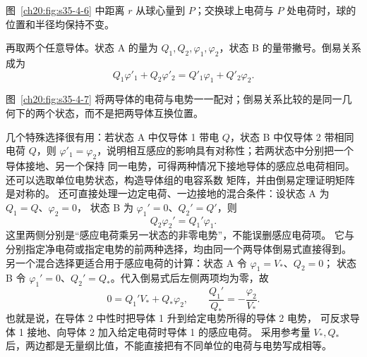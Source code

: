 {图~\ref{ch20:fig:s35-4-6} 中距离 $r$ 从球心量到 $P$；交换球上电荷与 $P$ 处电荷时，球的位置和半径均保持不变。

\par\noindent\begin{minipage}{\linewidth}
\greenSphereFigure
{}\label{ch20:fig:s35-4-6}
\end{minipage}\par\medskip

再取两个任意导体。状态 A 的量为 $Q_1,Q_2,\varphi_1,\varphi_2$，状态 B 的量带撇号。倒易关系成为
\begin{equation}
  \boxed{Q_1\varphi'_1+Q_2\varphi'_2
   =Q'_1\varphi_1+Q'_2\varphi_2}.
\end{equation}

图~\ref{ch20:fig:s35-4-7} 将两导体的电荷与电势一一配对；倒易关系比较的是同一几何下的两个状态，而不是把两导体互换位置。

\par\noindent\begin{minipage}{\linewidth}
\greenTwoConductorFigure
{}\label{ch20:fig:s35-4-7}
\end{minipage}\par\medskip

几个特殊选择很有用：若状态 A 中仅导体 1 带电 $Q$，状态 B 中仅导体 2 带相同电荷 $Q$，则
$\varphi'_1=\varphi_2$，说明相互感应的影响具有对称性；若两状态中分别把一个导体接地、另一个保持
同一电势，可得两种情况下接地导体的感应总电荷相同。还可以选取单位电势状态，构造导体组的电容系数
矩阵，并由倒易定理证明矩阵是对称的。
还可直接处理一边定电荷、一边接地的混合条件：设状态 A 为 $Q_1=Q$、$\varphi_2=0$，
状态 B 为 $\varphi_1'=0$、$Q_2'=Q'$，则
\[
 Q_2\varphi_2'=Q_1'\varphi_1.
\]
这里两侧分别是“感应电荷乘另一状态的非零电势”，不能误删感应电荷项。
它与分别指定净电荷或指定电势的前两种选择，均由同一个两导体倒易式直接得到。
另一个混合选择更适合用于感应电荷的计算：状态 A 令 $\varphi_1=V_*$、$Q_2=0$；
状态 B 令 $\varphi_1'=0$、$Q_2'=Q_*$。代入倒易式后左侧两项均为零，故
\[
 0=Q_1'V_*+Q_*\varphi_2,\qquad
 \boxed{\frac{Q_1'}{Q_*}=-\frac{\varphi_2}{V_*}}.
\]
也就是说，在导体 2 中性时把导体 1 升到给定电势所得的导体 2 电势，
可反求导体 1 接地、向导体 2 加入给定电荷时导体 1 的感应电荷。
采用参考量 $V_*,Q_*$ 后，两边都是无量纲比值，不能直接把有不同单位的电荷与电势写成相等。


}
